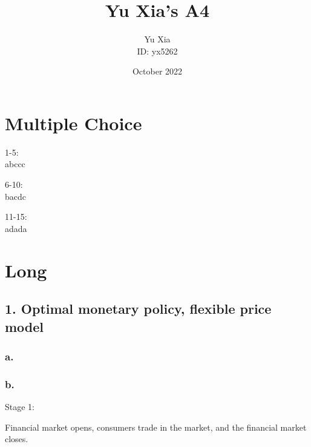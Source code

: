 \documentclass{article}
\author{Yu Xia \\ ID: yx5262}
\title{\textbf{Yu Xia's A4}}
\date{October 2022}
\begin{document}
\maketitle

\nocite{*}

\section*{\textrm{Multiple Choice}}

1-5:\\
abccc

6-10:\\
bacdc

11-15:\\
adada

\section*{\textrm{Long}}

\subsection*{\textrm{1. Optimal monetary policy, flexible price model}}

\subsubsection*{\textrm{a.}}


\subsubsection*{\textrm{b.}}

Stage 1:

Financial market opens, consumers trade in the market, and the financial market closes.
\end{document}
